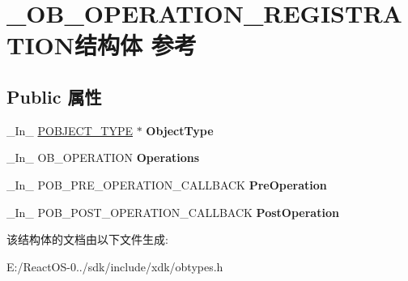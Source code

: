 \hypertarget{struct___o_b___o_p_e_r_a_t_i_o_n___r_e_g_i_s_t_r_a_t_i_o_n}{}\section{\+\_\+\+O\+B\+\_\+\+O\+P\+E\+R\+A\+T\+I\+O\+N\+\_\+\+R\+E\+G\+I\+S\+T\+R\+A\+T\+I\+O\+N结构体 参考}
\label{struct___o_b___o_p_e_r_a_t_i_o_n___r_e_g_i_s_t_r_a_t_i_o_n}
\subsection*{Public 属性}
\begin{DoxyCompactItemize}
\item 
\mbox{\label{struct___o_b___o_p_e_r_a_t_i_o_n___r_e_g_i_s_t_r_a_t_i_o_n_a4f543aafa2342f5a31b5d0be90c23ef4}} 
\+\_\+\+In\+\_\+ \hyperlink{struct___o_b_j_e_c_t___t_y_p_e}{P\+O\+B\+J\+E\+C\+T\+\_\+\+T\+Y\+PE} $\ast$ {\bfseries Object\+Type}
\item 
\mbox{\label{struct___o_b___o_p_e_r_a_t_i_o_n___r_e_g_i_s_t_r_a_t_i_o_n_ac10b6ecc8b3a813e6aeab68a263bb2f3}} 
\+\_\+\+In\+\_\+ O\+B\+\_\+\+O\+P\+E\+R\+A\+T\+I\+ON {\bfseries Operations}
\item 
\mbox{\label{struct___o_b___o_p_e_r_a_t_i_o_n___r_e_g_i_s_t_r_a_t_i_o_n_afcb1dcc860bbc195a59ec24a67988df9}} 
\+\_\+\+In\+\_\+ P\+O\+B\+\_\+\+P\+R\+E\+\_\+\+O\+P\+E\+R\+A\+T\+I\+O\+N\+\_\+\+C\+A\+L\+L\+B\+A\+CK {\bfseries Pre\+Operation}
\item 
\mbox{\label{struct___o_b___o_p_e_r_a_t_i_o_n___r_e_g_i_s_t_r_a_t_i_o_n_a809896fd82dceca9808230d8768d0d74}} 
\+\_\+\+In\+\_\+ P\+O\+B\+\_\+\+P\+O\+S\+T\+\_\+\+O\+P\+E\+R\+A\+T\+I\+O\+N\+\_\+\+C\+A\+L\+L\+B\+A\+CK {\bfseries Post\+Operation}
\end{DoxyCompactItemize}


该结构体的文档由以下文件生成\+:\begin{DoxyCompactItemize}
\item 
E\+:/\+React\+O\+S-\/0../sdk/include/xdk/obtypes.\+h\end{DoxyCompactItemize}
